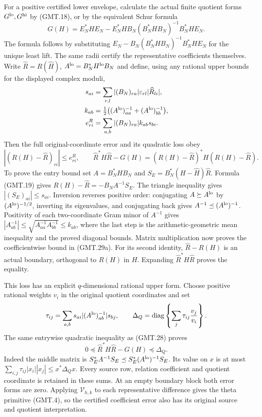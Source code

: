 \documentclass[11pt]{article}
\newcommand{\diag}{\operatorname{diag}}
\begin{document}
For a positive certified lower envelope, calculate the actual finite
quotient forms $G^{\rm lo},G^{\rm hi}$ by (GMT.18), or by the
equivalent Schur formula
\[
 G(H)=E_N^*HE_N-E_N^*HB_N(B_N^*HB_N)^{-1}B_N^*HE_N.             \tag{GMT.29}
\]
The formula follows by substituting
$E_N-B_N(B_N^*HB_N)^{-1}B_N^*HE_N$ for the unique least lift.
The same radii certify the representative coefficients themselves.
Write $\widehat R=R(\widehat H)$,
$A^{\rm lo}=B_N^*H^{\rm lo}B_N$ and define, using any rational
upper bounds for the displayed complex moduli,
\[
 \begin{split}
 s_{ai}&=\sum_{r,l}|(B_N)_{ra}|\varepsilon_{rl}|\widehat R_{li}|,\\
 k_{ab}&=\tfrac12\bigl((A^{\rm lo})^{-1}_{aa}
                              +(A^{\rm lo})^{-1}_{bb}\bigr),\\
 e^R_{ri}&=\sum_{a,b}|(B_N)_{ra}|k_{ab}s_{bi}.
 \end{split}
\]
Then the full original-coordinate error and its quadratic loss obey
\[
 \boxed{|(R(H)-\widehat R)_{ri}|\le e^R_{ri},\qquad
 \widehat R^*H\widehat R-G(H)
 =(R(H)-\widehat R)^*H(R(H)-\widehat R).}                     \tag{GMT.29a}
\]
To prove the entry bound set $A=B_N^*HB_N$ and
$S_E=B_N^*(H-\widehat H)\widehat R$.
Formula (GMT.19) gives $R(H)-\widehat R=-B_NA^{-1}S_E$.
The triangle inequality gives $|(S_E)_{ai}|\le s_{ai}$.
Inversion reverses positive order: conjugating $A\succeq A^{\rm lo}$
by $(A^{\rm lo})^{-1/2}$, inverting its eigenvalues, and conjugating
back gives $A^{-1}\preceq(A^{\rm lo})^{-1}$.
Positivity of each two-coordinate Gram minor of $A^{-1}$ gives
$|A^{-1}_{ab}|\le\sqrt{A^{-1}_{aa}A^{-1}_{bb}}\le k_{ab}$,
where the last step is the arithmetic-geometric mean inequality and
the proved diagonal bounds. Matrix multiplication now proves the
coefficientwise bound in (GMT.29a). For its second identity,
$\widehat R-R(H)$ is an actual boundary, orthogonal to $R(H)$
in $H$. Expanding $\widehat R^*H\widehat R$ proves the equality.

This loss has an explicit $q$-dimensional rational upper form.
Choose positive rational weights $v_i$ in the original quotient
coordinates and set
\[
 \tau_{ij}=\sum_{a,b}s_{ai}|(A^{\rm lo})^{-1}_{ab}|s_{bj},\qquad
 \Delta_Q=\diag\left\{\sum_j\tau_{ij}\frac{v_j}{v_i}\right\}.
\]
The same entrywise quadratic inequality as (GMT.28) proves
\[
 \boxed{0\preceq\widehat R^*H\widehat R-G(H)\preceq\Delta_Q.}
                                                                    \tag{GMT.29b}
\]
Indeed the middle matrix is $S_E^*A^{-1}S_E\preceq
S_E^*(A^{\rm lo})^{-1}S_E$. Its value on $x$ is at most
$\sum_{i,j}\tau_{ij}|x_i||x_j|\le x^*\Delta_Qx$.
Every source row, relation coefficient and quotient coordinate is
retained in these sums. At an empty boundary block both error forms
are zero. Applying $\mathcal V_{h,k}$ to each representative difference
gives the theta primitive (GMT.4), so the certified coefficient
error also has its original source and quotient interpretation.
\end{document}
